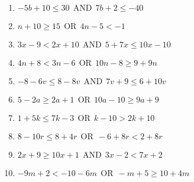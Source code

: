 \documentclass[12pt]{article}
\theoremstyle{definition}
\begin{document}
\begin{enumerate}
	\item $- 5 b + 10 \leq 30  \ \ \text{AND} \ \  7 b + 2 \leq - 40$\\
  \item $n + 10 \geq 15  \ \ \text{OR} \ \  4 n - 5 < - 1$\\
	\item $3 x - 9 < 2 x + 10  \ \ \text{AND} \ \  5 + 7 x \leq 10 x - 10$\\
  \item $4 n + 8 < 3 n - 6  \ \ \text{OR} \ \  10 n - 8 \geq 9 + 9 n$\\
  \item $- 8 - 6 v \leq 8 - 8 v  \ \ \text{AND} \ \  7 v + 9 \leq 6 + 10 v$\\
  \item $5 - 2 a \geq 2 a + 1  \ \ \text{OR} \ \  10 a - 10 \geq 9 a + 9$\\
  \item $1 + 5 k \leq 7 k - 3  \ \ \text{OR} \ \  k - 10 > 2 k + 10$\\
  \item $8 - 10 r \leq 8 + 4 r  \ \ \text{OR} \ \  - 6 + 8 r < 2 + 8 r$\\
  \item $2 x + 9 \geq 10 x + 1  \ \ \text{AND} \ \  3 x - 2 < 7 x + 2$\\
  \item $- 9 m + 2 < - 10 - 6 m  \ \ \text{OR} \ \  - m + 5 \geq 10 + 4 m$
\end{enumerate}
\newpage
\end{document}
